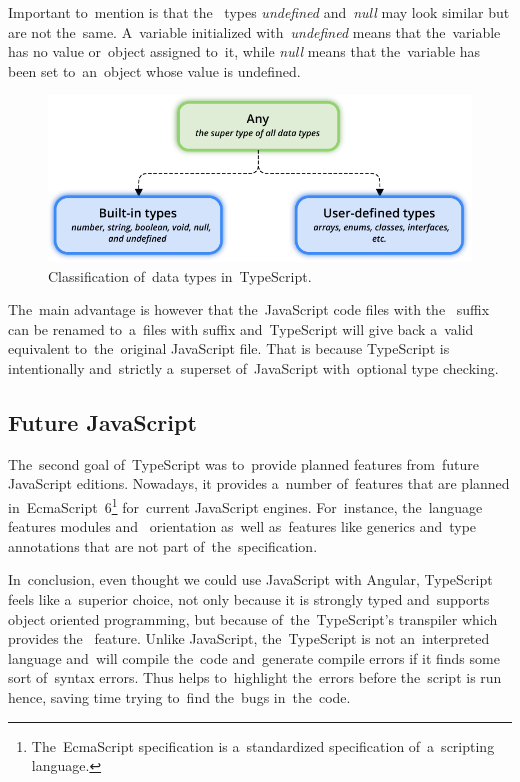 Important to~mention is that the~ types \textit{undefined}
and~\textit{null} may look similar but are not the~same. A~variable initialized
with~\textit{undefined} means that the~variable has no value or~object assigned
to~it, while \textit{null} means that the~variable has been set to~an~object
whose value is undefined.

\begin{figure}[!hbt]
	\centering
	\includegraphics[scale=0.8]{./figures/data-types.pdf}
	\caption{Classification of~data types in~TypeScript.}
	\label{fig-datatypes}
\end{figure}

The~main advantage is however that the~JavaScript code files with the~
suffix can be renamed to~a~files with  suffix and~TypeScript will give
back a~valid equivalent to~the~original JavaScript file. That is because
TypeScript is intentionally and~strictly a~superset of~JavaScript with~optional
type checking.


\subsection{Future JavaScript}
The~second goal of~TypeScript was to~provide planned features from~future
JavaScript editions. Nowadays, it provides a~number of~features that are planned
in~EcmaScript~6\footnote{The~EcmaScript specification is a~standardized
specification of~a~scripting language.} for~current JavaScript engines.
For~instance, the~language features modules and~ orientation
as~well as~features like generics and~type annotations that are not part
of~the~specification.

In~conclusion, even thought we could use JavaScript with Angular, TypeScript
feels like a~superior choice, not only because it is strongly typed and~supports
object oriented programming, but because of~the~TypeScript's transpiler which
provides the~ feature. Unlike JavaScript,
the~TypeScript is not an~interpreted language and~will compile the~code
and~generate compile errors if it finds some sort of~syntax errors. Thus
helps to~highlight the~errors before the~script is run hence, saving time trying
to~find the~bugs in~the~code.


